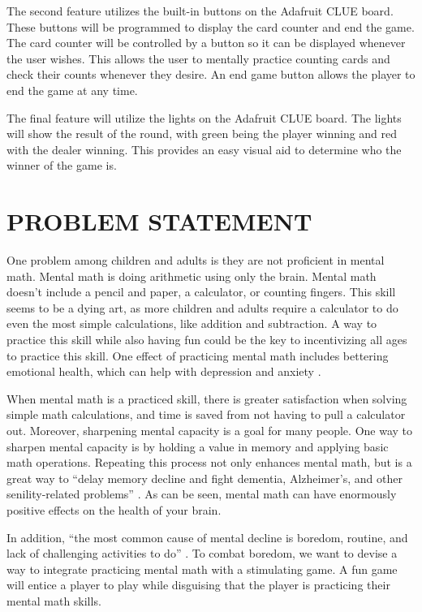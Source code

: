 \documentclass[12pt]{article}
\begin{document}
The second feature utilizes the built-in buttons on the Adafruit CLUE board. These buttons will be programmed to display the card counter and end the game. The card counter will be controlled by a button so it can be displayed whenever the user wishes. This allows the user to mentally practice counting cards and check their counts whenever they desire. An end game button allows the player to end the game at any time.

The final feature will utilize the lights on the Adafruit CLUE board. The lights will show the result of the round, with green being the player winning and red with the dealer winning. This provides an easy visual aid to determine who the winner of the game is.

\section{PROBLEM STATEMENT}
One problem among children and adults is they are not proficient in mental math. Mental math is doing arithmetic using only the brain. Mental math doesn't include a pencil and paper, a calculator, or counting fingers. This skill seems to be a dying art, as more children and adults require a calculator to do even the most simple calculations, like addition and subtraction. 
A way to practice this skill while also having fun could be the key to incentivizing all ages to practice this skill. One effect of practicing mental math includes bettering emotional health, which can help with depression and anxiety \cite{dukeu}.

When mental math is a practiced skill, there is greater satisfaction when solving simple math calculations, and time is saved from not having to pull a calculator out. 
Moreover, sharpening mental capacity is a goal for many people. One way to sharpen mental capacity is by holding a value in memory and applying basic math operations. Repeating this process not only enhances mental math, but is a great way to “delay memory decline and fight dementia, Alzheimer’s, and other senility-related problems” \cite{cnsuwo}.
As can be seen, mental math can have enormously positive effects on the health of your brain. 

In addition, “the most common cause of mental decline is boredom, routine, and lack of challenging activities to do” \cite{cnsuwo}. To combat boredom, we want to devise a way to integrate practicing mental math with a stimulating game. A fun game will entice a player to play while disguising that the player is practicing their mental math skills. 
\end{document}
